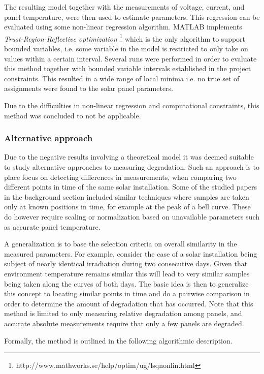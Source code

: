 The resulting model together with the measurements of voltage, current, and panel temperature, were then used to estimate parameters.
This regression can be evaluated using some non-linear regression algorithm.
MATLAB implements \emph{Trust-Region-Reflective optimization} \footnote{http://www.mathworks.se/help/optim/ug/lsqnonlin.html} which is the only algorithm to support bounded variables, i.e. some variable in the model is restricted to only take on values within a certain interval.
Several runs were performed in order to evaluate this method together with bounded variable intervals established in the project constraints.
This resulted in a wide range of local minima i.e. no true set of assignments were found to the solar panel parameters.

Due to the difficulties in non-linear regression and computational constraints, this method was concluded to not be applicable.

\subsubsection{Alternative approach}
Due to the negative results involving a theoretical model it was deemed suitable to study alternative approaches to measuring degradation.
Such an approach is to place focus on detecting differences in measurements, when comparing two different points in time of the same solar installation.
Some of the studied papers in the background section included similar techniques where samples are taken only at known positions in time, for example at the peak of a bell curve.
These do however require scaling or normalization based on unavailable parameters such as accurate panel temperature.

A generalization is to base the selection criteria on overall similarity in the measured parameters.
For example, consider the case of a solar installation being subject of nearly identical irradiation during two consecutive days.
Given that environment temperature remains similar this will lead to very similar samples being taken along the curves of both days.
The basic idea is then to generalize this concept to locating similar points in time and do a pairwise comparison in order to determine the amount of degradation that has occurred.
Note that this method is limited to only measuring relative degradation among panels, and accurate absolute measurements require that only a few panels are degraded.

Formally, the method is outlined in the following algorithmic description.


